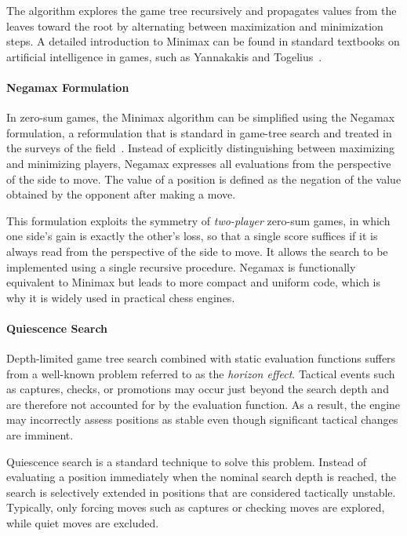 The algorithm explores the game tree recursively and propagates values from the
leaves toward the root by alternating between maximization and minimization
steps. A detailed introduction to Minimax can be found in standard textbooks on
artificial intelligence in games, such as Yannakakis and
Togelius~\cite{yannakakis2018artificial}.

\paragraph{Negamax Formulation}
In zero-sum games, the Minimax algorithm can be simplified using the Negamax
formulation, a reformulation that is standard in game-tree search and treated
in the surveys of the field~\cite{marsland1986review, knuth1975alphabeta}. Instead of explicitly distinguishing between maximizing and
minimizing players, Negamax expresses all evaluations from the perspective of the
side to move. The value of a position is defined as the negation of the value
obtained by the opponent after making a move.

This formulation exploits the symmetry of \emph{two-player} zero-sum games, in
which one side's gain is exactly the other's loss, so that a single score suffices
if it is always read from the perspective of the side to move. It allows the
search to be implemented using a single recursive procedure. Negamax is
functionally equivalent to Minimax but leads to more compact and uniform code,
which is why it is widely used in practical chess engines.

\paragraph{Quiescence Search}
Depth-limited game tree search combined with static evaluation functions suffers
from a well-known problem referred to as the \emph{horizon effect}. Tactical
events such as captures, checks, or promotions may occur just beyond the search
depth and are therefore not accounted for by the evaluation function. As a
result, the engine may incorrectly assess positions as stable even though
significant tactical changes are imminent.

Quiescence search is a standard technique to solve this problem. Instead of
evaluating a position immediately when the nominal search depth is reached, the
search is selectively extended in positions that are considered tactically
unstable. Typically, only forcing moves such as captures or checking moves are
explored, while quiet moves are excluded.

